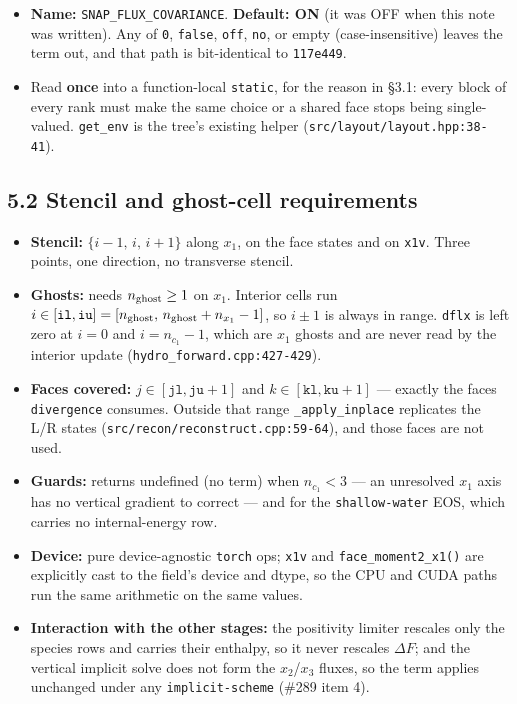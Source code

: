 \documentclass[11pt,a4paper]{article}
\begin{document}
\begin{itemize}
\item \textbf{Name:} \texttt{SNAP\_FLUX\_COVARIANCE}. \textbf{Default: ON} (it was OFF when this note
  was written). Any of \texttt{0}, \texttt{false}, \texttt{off}, \texttt{no}, or empty (case-insensitive)
  leaves the term out, and that path is bit-identical to \texttt{117e449}.
\item Read \textbf{once} into a function-local \texttt{static}, for the reason in §3.1: every
  block of every rank must make the same choice or a shared face stops being
  single-valued. \texttt{get\_env} is the tree's existing helper
  (\texttt{src/layout/layout.hpp:38-41}).
\end{itemize}

\subsection*{5.2 Stencil and ghost-cell requirements}

\begin{itemize}
\item \textbf{Stencil:} $\{i-1,\,i,\,i+1\}$ along $x_1$, on the face states and on \texttt{x1v}.
  Three points, one direction, no transverse stencil.
\item \textbf{Ghosts:} needs $n_{\rm ghost}\ge1$ on $x_1$. Interior cells run
  $i\in[\texttt{il},\texttt{iu}]=[n_{\rm ghost},\,n_{\rm ghost}+n_{x_1}-1]$, so
  $i\pm1$ is always in range. \texttt{dflx} is left zero at $i=0$ and $i=n_{c_1}-1$,
  which are $x_1$ ghosts and are never read by the interior update
  (\texttt{hydro\_forward.cpp:427-429}).
\item \textbf{Faces covered:} $j\in[\texttt{jl},\texttt{ju}{+}1]$ and
  $k\in[\texttt{kl},\texttt{ku}{+}1]$ — exactly the faces \texttt{divergence} consumes.
  Outside that range \texttt{\_apply\_inplace} replicates the L/R states
  (\texttt{src/recon/reconstruct.cpp:59-64}), and those faces are not used.
\item \textbf{Guards:} returns undefined (no term) when $n_{c_1}<3$ — an unresolved $x_1$
  axis has no vertical gradient to correct — and for the \texttt{shallow-water} EOS,
  which carries no internal-energy row.
\item \textbf{Device:} pure device-agnostic \texttt{torch} ops; \texttt{x1v} and \texttt{face\_moment2\_x1()} are
  explicitly cast to the field's device and dtype, so the CPU and CUDA paths run
  the same arithmetic on the same values.
\item \textbf{Interaction with the other stages:} the positivity limiter rescales only the
  species rows and carries their enthalpy, so it never rescales $\Delta F$; and
  the vertical implicit solve does not form the $x_2$/$x_3$ fluxes, so the term
  applies unchanged under any \texttt{implicit-scheme} (\#289 item 4).
\end{itemize}
\end{document}
